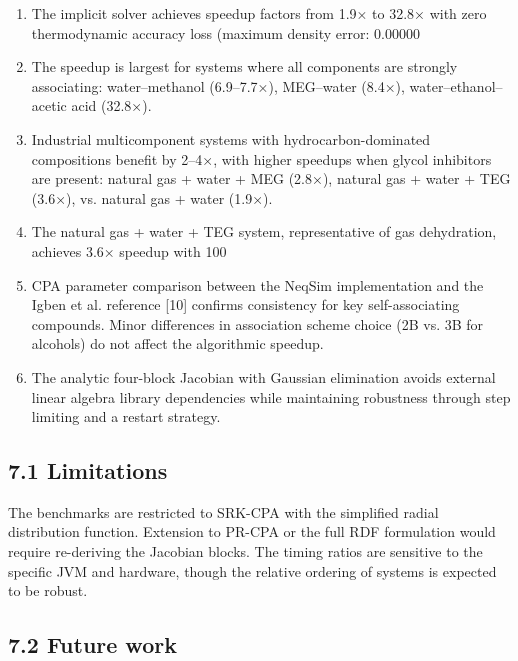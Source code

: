 \documentclass[review,3p]{elsarticle}
\begin{document}
\begin{enumerate}
  \item The implicit solver achieves speedup factors from 1.9× to 32.8× with zero thermodynamic accuracy loss (maximum density error: 0.00000%

  \item The speedup is largest for systems where all components are strongly associating: water–methanol (6.9–7.7×), MEG–water (8.4×), water–ethanol–acetic acid (32.8×).

  \item Industrial multicomponent systems with hydrocarbon-dominated compositions benefit by 2–4×, with higher speedups when glycol inhibitors are present: natural gas + water + MEG (2.8×), natural gas + water + TEG (3.6×), vs. natural gas + water (1.9×).

  \item The natural gas + water + TEG system, representative of gas dehydration, achieves 3.6× speedup with 100%

  \item CPA parameter comparison between the NeqSim implementation and the Igben et al. reference [10] confirms consistency for key self-associating compounds. Minor differences in association scheme choice (2B vs. 3B for alcohols) do not affect the algorithmic speedup.

  \item The analytic four-block Jacobian with Gaussian elimination avoids external linear algebra library dependencies while maintaining robustness through step limiting and a restart strategy.
\end{enumerate}

\subsection{7.1 Limitations}

The benchmarks are restricted to SRK-CPA with the simplified radial distribution function. Extension to PR-CPA or the full RDF formulation would require re-deriving the Jacobian blocks. The timing ratios are sensitive to the specific JVM and hardware, though the relative ordering of systems is expected to be robust.

\subsection{7.2 Future work}
\end{document}
